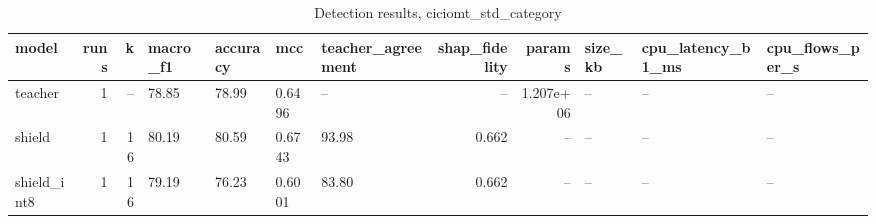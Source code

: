 \begin{table}
\caption{Detection results, ciciomt_std_category}
\begin{tabular}{lrrllllrrlll}
\toprule
model & runs & k & macro_f1 & accuracy & mcc & teacher_agreement & shap_fidelity & params & size_kb & cpu_latency_b1_ms & cpu_flows_per_s \\
\midrule
teacher & 1 & -- & 78.85 & 78.99 & 0.6496 & -- & -- & 1.207e+06 & -- & -- & -- \\
shield & 1 & 16 & 80.19 & 80.59 & 0.6743 & 93.98 & 0.662 & -- & -- & -- & -- \\
shield_int8 & 1 & 16 & 79.19 & 76.23 & 0.6001 & 83.80 & 0.662 & -- & -- & -- & -- \\
\bottomrule
\end{tabular}
\end{table}
